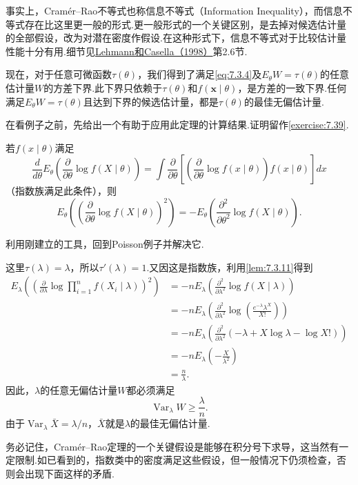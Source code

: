 事实上，Cramér--Rao不等式也称信息不等式（Information Inequality），而信息不等式存在比这里更一般的形式.更一般形式的一个关键区别，是去掉对候选估计量的全部假设，改为对潜在密度作假设.在这种形式下，信息不等式对于比较估计量性能十分有用.细节见\hyperref[bib:source200]{Lehmann和Casella（1998）}第2.6节.

现在，对于任意可微函数$\tau(\theta)$，我们得到了满足\eqref{eq:7.3.4}及$E_\theta W=\tau(\theta)$的任意估计量$W$的方差下界.此下界只依赖于$\tau(\theta)$和$f(\boldsymbol x\mid\theta)$，是方差的一致下界.任何满足$E_\theta W=\tau(\theta)$且达到下界的候选估计量，都是$\tau(\theta)$的最佳无偏估计量.

在看例子之前，先给出一个有助于应用此定理的计算结果.证明留作\autoref{exercise:7.39}.
\begin{lemma}\label{lem:7.3.11}
若$f(x\mid\theta)$满足
$$\frac d{d\theta}E_\theta\left(\frac\partial{\partial\theta}\log f(X\mid\theta)\right)=\int\frac\partial{\partial\theta}\left[\left(\frac\partial{\partial\theta}\log f(x\mid\theta)\right)f(x\mid\theta)\right]dx$$
（指数族满足此条件），则
$$E_\theta\left(\left(\frac\partial{\partial\theta}\log f(X\mid\theta)\right)^2\right)=-E_\theta\left(\frac{\partial^2}{\partial\theta^2}\log f(X\mid\theta)\right).$$
\end{lemma}
利用刚建立的工具，回到Poisson例子并解决它.
\begin{example}\label{ex:7.3.12}
这里$\tau(\lambda)=\lambda$，所以$\tau'(\lambda)=1$.又因这是指数族，利用\autoref{lem:7.3.11}得到
\begin{align*}
E_\lambda\left(\left(\frac\partial{\partial\lambda}\log\prod_{i=1}^nf(X_i\mid\lambda)\right)^2\right)
&=-nE_\lambda\left(\frac{\partial^2}{\partial\lambda^2}\log f(X\mid\lambda)\right)\\
&=-nE_\lambda\left(\frac{\partial^2}{\partial\lambda^2}\log\left(\frac{e^{-\lambda}\lambda^X}{X!}\right)\right)\\
&=-nE_\lambda\left(\frac{\partial^2}{\partial\lambda^2}(-\lambda+X\log\lambda-\log X!)\right)\\
&=-nE_\lambda\left(-\frac X{\lambda^2}\right)\\
&=\frac n\lambda.
\end{align*}
因此，$\lambda$的任意无偏估计量$W$都必须满足
$$\operatorname{Var}_\lambda W\ge\frac\lambda n.$$
由于$\operatorname{Var}_\lambda\bar X=\lambda/n$，$\bar X$就是$\lambda$的最佳无偏估计量.
\end{example}
务必记住，Cramér--Rao定理的一个关键假设是能够在积分号下求导，这当然有一定限制.如已看到的，指数类中的密度满足这些假设，但一般情况下仍须检查，否则会出现下面这样的矛盾.
